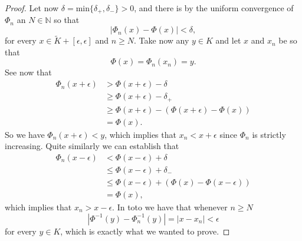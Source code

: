 \documentclass[11pt, a4paper]{article}
\begin{document}
\begin{appendix}
\begin{proof}
Let now $\delta = \mathrm{min}\{\delta_+, \delta_- \}>0$, and there is by the uniform convergence of $\Phi_n$ an $N \in \mathbb{N}$ so that
\begin{equation*}
|\Phi_n(x) - \Phi(x)| < \delta,
\end{equation*}
for every $x \in \tilde{K}+[\epsilon, \epsilon]$ and $n \geq N$. Take now any $y \in K$ and let $x$ and $x_n$ be so that
\begin{equation*}
\Phi(x) = \Phi_n(x_n) = y.
\end{equation*}
See now that
\begin{align*}
\Phi_n(x+\epsilon) &> \Phi(x+\epsilon) -\delta \\
&\geq    \Phi(x+\epsilon) -\delta_+ \\
&\geq \Phi(x+\epsilon) - (\Phi(x+\epsilon) - \Phi(x)) \\
&= \Phi(x).
\end{align*}
So we have $\Phi_n(x+\epsilon) < y$, which implies that $x_n < x+\epsilon$ since $\Phi_n$ is strictly increasing. Quite similarly we can establish that
\begin{align*}
\Phi_n(x-\epsilon) &< \Phi(x-\epsilon) + \delta \\
&\leq \Phi(x-\epsilon) + \delta_- \\
&\leq \Phi(x-\epsilon) + (\Phi(x) - \Phi(x-\epsilon)) \\
&= \Phi(x),
\end{align*}
which implies that $x_n > x-\epsilon$. In toto we have that whenever $n\geq N$
\begin{equation*}
|\Phi^{-1}(y) - \Phi_n^{-1}(y)| = |x - x_n| < \epsilon
\end{equation*}
for every $y \in K$, which is exactly what we wanted to prove.




\end{proof}


\end{appendix}
\end{document}
